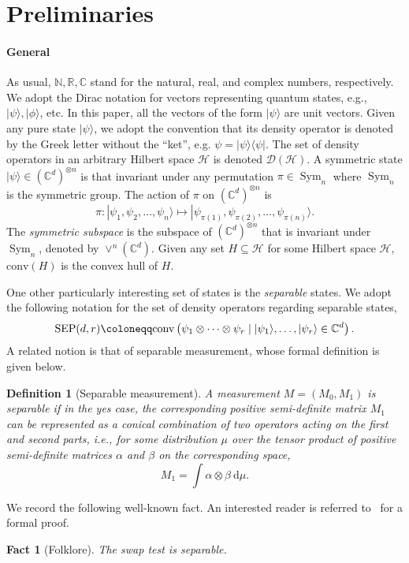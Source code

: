 \documentclass[10pt,a4paper]{article}
\newtheorem{definition}[theorem]{Definition}
\newtheorem{fact}[theorem]{Fact}
\theoremstyle{remark}
\newcommand{\R}{{\mathbb R}}
\newcommand{\C}{{\mathbb C}}
\newcommand{\N}{{\mathbb{N}}}
\newcommand{\cH}{\mathcal{H}}
\newcommand{\cD}{\mathcal{D}}
\newcommand{\conv}[1]{\mathrm{conv}\inparen{#1}}
\DeclareMathOperator{\sym}{\operatorname{Sym}}
\newcommand{\1}[1]{\mathds{1}{[#1]}}
\newcommand{\inparen}[1]{\left(#1\right)}             %
\newcommand{\ket}[1]{\lvert #1\rangle}
\newcommand{\SEP}{\textup{SEP}}
\newcommand{\Symm}[2]{\vee^{#1}(\C^{#2})}
\newcommand{\bra}[1]{\langle#1|}
\numberwithin{equation}{section}
\begin{document}
\section{Preliminaries} \label{sec:prelim}

\paragraph{General}
As usual, $\N, \R, \C $ stand for the natural, real, and complex numbers, respectively. %
%
We adopt the Dirac notation for vectors representing quantum states, e.g., $\ket\psi, \ket\phi$, etc. In this paper, all the vectors of the form $\ket\psi$ are unit vectors. Given any pure state $\ket\psi$, we adopt the convention that its density operator is denoted by the Greek letter without the ``ket'', e.g. $\psi = \ket\psi\bra\psi$. The set of density operators in an arbitrary Hilbert space $\cH$ is denoted $\cD(\cH)$.
A symmetric state $\ket\psi \in (\C^d)^{\otimes n}$ is that invariant under any permutation $\pi\in \sym_n$ where $\sym_n$ is the symmetric group. The action of $\pi$ on $(\C^d)^{\otimes n}$ is  
\[
\pi:|\psi_1, \psi_2, \ldots, \psi_n\rangle
\mapsto |\psi_{\pi(1)}, \psi_{\pi(2)}, \ldots, \psi_{\pi(n)} \rangle.
\]
The \emph{symmetric subspace} is the subspace of $(\C^d)^{\otimes n}$ that is invariant under $\sym_n$, denoted by $\Symm{n}{d}$. Given any set $H\subseteq \cH$ for some Hilbert space $\cH$, $\conv H$ is the convex hull of $H$. 

One other particularly interesting set of states is the \emph{separable} states. We adopt the following notation for the set of density operators regarding separable states,
\begin{align*}
  \SEP(d,r) \coloneqq \conv{\psi_1 \otimes \cdots \otimes \psi_r \mid \ket{\psi_1},\ldots,\ket{\psi_r} \in \C^d}.
\end{align*}
A related notion is that of separable measurement, whose formal definition is given below.
\begin{definition}[Separable measurement]
A measurement $M = (M_0, M_1)$ is separable if in the yes case, the corresponding positive semi-definite matrix $M_1$ can be represented as a conical combination of two operators acting on the first and second parts, i.e.,
for some distribution $\mu$ over the tensor product of positive semi-definite matrices $\alpha$ and $\beta$ on the corresponding space,
\[
M_1 = \int  \alpha \otimes \beta ~\mathrm{d}\mu.
\]
\end{definition}
We record the following well-known fact. An interested reader is referred to~\cite{harrow2013church} for a formal proof.
\begin{fact}[Folklore] \label{fact:swap-test-sep}
The swap test is separable.
\end{fact}
\end{document}
